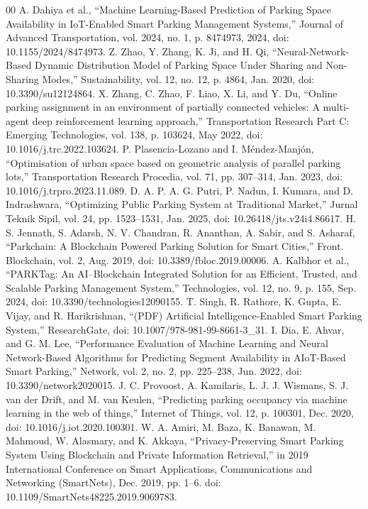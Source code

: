 \documentclass[conference]{IEEEtran}
\begin{document}
\begin{thebibliography}{00}
 A. Dahiya et al., “Machine Learning-Based Prediction of Parking Space Availability in IoT-Enabled Smart Parking Management Systems,” Journal of Advanced Transportation, vol. 2024, no. 1, p. 8474973, 2024, doi: 10.1155/2024/8474973.
 Z. Zhao, Y. Zhang, K. Ji, and H. Qi, “Neural-Network-Based Dynamic Distribution Model of Parking Space Under Sharing and Non-Sharing Modes,” Sustainability, vol. 12, no. 12, p. 4864, Jan. 2020, doi: 10.3390/su12124864.
 X. Zhang, C. Zhao, F. Liao, X. Li, and Y. Du, “Online parking assignment in an environment of partially connected vehicles: A multi-agent deep reinforcement learning approach,” Transportation Research Part C: Emerging Technologies, vol. 138, p. 103624, May 2022, doi: 10.1016/j.trc.2022.103624.
 P. Plasencia-Lozano and I. Méndez-Manjón, “Optimisation of urban space based on geometric analysis of parallel parking lots,” Transportation Research Procedia, vol. 71, pp. 307–314, Jan. 2023, doi: 10.1016/j.trpro.2023.11.089.
 D. A. P. A. G. Putri, P. Nadun, I. Kumara, and D. Indrashwara, “Optimizing Public Parking System at Traditional Market,” Jurnal Teknik Sipil, vol. 24, pp. 1523–1531, Jan. 2025, doi: 10.26418/jts.v24i4.86617.
 H. S. Jennath, S. Adarsh, N. V. Chandran, R. Ananthan, A. Sabir, and S. Asharaf, “Parkchain: A Blockchain Powered Parking Solution for Smart Cities,” Front. Blockchain, vol. 2, Aug. 2019, doi: 10.3389/fbloc.2019.00006.
 A. Kalbhor et al., “PARKTag: An AI–Blockchain Integrated Solution for an Efficient, Trusted, and Scalable Parking Management System,” Technologies, vol. 12, no. 9, p. 155, Sep. 2024, doi: 10.3390/technologies12090155.
 T. Singh, R. Rathore, K. Gupta, E. Vijay, and R. Harikrishnan, “(PDF) Artificial Intelligence-Enabled Smart Parking System,” ResearchGate, doi: 10.1007/978-981-99-8661-3\_31.
 I. Dia, E. Ahvar, and G. M. Lee, “Performance Evaluation of Machine Learning and Neural Network-Based Algorithms for Predicting Segment Availability in AIoT-Based Smart Parking,” Network, vol. 2, no. 2, pp. 225–238, Jun. 2022, doi: 10.3390/network2020015.
 J. C. Provoost, A. Kamilaris, L. J. J. Wismans, S. J. van der Drift, and M. van Keulen, “Predicting parking occupancy via machine learning in the web of things,” Internet of Things, vol. 12, p. 100301, Dec. 2020, doi: 10.1016/j.iot.2020.100301.
 W. A. Amiri, M. Baza, K. Banawan, M. Mahmoud, W. Alasmary, and K. Akkaya, “Privacy-Preserving Smart Parking System Using Blockchain and Private Information Retrieval,” in 2019 International Conference on Smart Applications, Communications and Networking (SmartNets), Dec. 2019, pp. 1–6. doi: 10.1109/SmartNets48225.2019.9069783.

\end{thebibliography}
\end{document}
